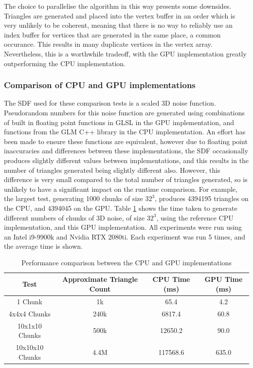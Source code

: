 \documentclass{article}
\begin{document}
The choice to parallelise the algorithm in this way presents some downsides. Triangles are generated and placed into the vertex buffer in an order which is very unlikely to be coherent, meaning that there is no way to reliably use an index buffer for vertices that are generated in the same place, a common occurance. This results in many duplicate vertices in the vertex array. Nevertheless, this is a worthwhile tradeoff, with the GPU implementation greatly outperforming the CPU implementation. 
\subsubsection{Comparison of CPU and GPU implementations}
The SDF used for these comparison tests is a scaled 3D noise function. Pseudorandom numbers for this noise function are generated using combinations of built in floating point functions in GLSL in the GPU implementation, and functions from the GLM C++ library in the CPU implementation. An effort has been made to ensure these functions are equivalent, however due to floating point inaccuracies and differences between these implementations, the SDF occasionally produces slightly different values between implementations, and this results in the number of triangles generated being slightly different also. However, this difference is very small compared to the total number of triangles generated, so is unlikely to have a significant impact on the runtime comparison. For example, the largest test, generating 1000 chunks of size $32^3$, produces 4394195 triangles on the CPU, and 4394045 on the GPU.
Table \ref{tab:cpu-gpu-comparison} shows the time taken to generate different numbers of chunks of 3D noise, of size $32^3$, using the reference CPU implementation, and this GPU implementation. All experiments were run using an Intel i9-9900k and Nvidia RTX 2080ti. Each experiment was run 5 times, and the average time is shown.
\begin{table}[H]
  \begin{tabular}{|c|c|c|c|}
    \hline
    Test & Approximate Triangle Count & CPU Time (ms) & GPU Time (ms) \\
    \hline
    \hline
    1 Chunk & 1k & 65.4 & 4.2\\
    4x4x4 Chunks & 240k & 6817.4 & 60.8\\
    10x1x10 Chunks & 500k & 12650.2 & 90.0\\
    10x10x10 Chunks & 4.4M & 117568.6 & 635.0\\
    \hline
    
  \end{tabular}
  \caption{\label{tab:cpu-gpu-comparison}Performance comparison between the CPU and GPU implementations}
\end{table}
\end{document}
